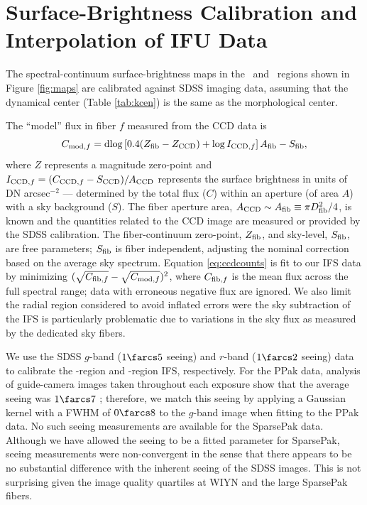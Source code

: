 \documentclass[apj,iop,numberedappendix]{emulateapj}
\begin{document}
% 


\appendix

\section{Surface-Brightness Calibration and Interpolation of IFU Data}
\label{app:maps}

The spectral-continuum surface-brightness maps in the \halp\ and \mgi\ regions
shown in Figure \ref{fig:maps} are calibrated against SDSS imaging data,
assuming that the dynamical center (Table \ref{tab:kcen}) is the same as the
morphological center.

The ``model'' flux in fiber $f$ measured from the CCD data is
%
\begin{equation}
%
C_{{\rm mod},f} = {\rm dlog}\left[ 0.4(Z_{\rm fib} - Z_{\rm CCD}) + \log I_{{\rm
CCD},f}\right] A_{\rm fib} - S_{\rm fib},
%
\label{eq:ccdcounts}
%
\end{equation}
%
where $Z$ represents a magnitude zero-point and $I_{{\rm CCD},f} = (C_{{\rm
CCD},f}-S_{\rm CCD})/A_{\rm CCD}$ represents the surface brightness in units of
DN arcsec$^{-2}$ --- determined by the total flux ($C$) within an aperture (of
area $A$) with a sky background ($S$).  The fiber aperture area, $A_{\rm CCD}
\sim A_{\rm fib} \equiv \pi D_{\rm fib}^2/4$, is known and the quantities
related to the CCD image are measured or provided by the SDSS calibration.  The
fiber-continuum zero-point, $Z_{\rm fib}$, and sky-level, $S_{\rm fib}$, are
free parameters; $S_{\rm fib}$ is fiber independent, adjusting the nominal
correction based on the average sky spectrum.  Equation \ref{eq:ccdcounts} is
fit to our IFS data by minimizing $(\sqrt{C_{{\rm fib},f}} - \sqrt{C_{{\rm
mod},f}})^2$, where $C_{{\rm fib},f}$ is the mean flux across the full spectral
range; data with erroneous negative flux are ignored.  We also limit the radial
region considered to avoid inflated errors were the sky subtraction of the IFS
is particularly problematic due to variations in the sky flux as measured by the
dedicated sky fibers.

We use the SDSS $g$-band ($1\farcs5$ seeing) and $r$-band ($1\farcs2$ seeing)
data to calibrate the \mgi-region and \halp-region IFS, respectively.  For the
PPak data, analysis of guide-camera images taken throughout each exposure show
that the average seeing was $1\farcs7$ \citep{TPKMPhD}; therefore, we match this
seeing by applying a Gaussian kernel with a FWHM of $0\farcs8$ to the $g$-band
image when fitting to the PPak data.  No such seeing measurements are available
for the SparsePak data.  Although we have allowed the seeing to be a fitted
parameter for SparsePak, seeing measurements were non-convergent in the sense
that there appears to be no substantial difference with the inherent seeing of
the SDSS images.  This is not surprising given the image quality quartiles at
WIYN and the large SparsePak fibers.  
\end{document}
